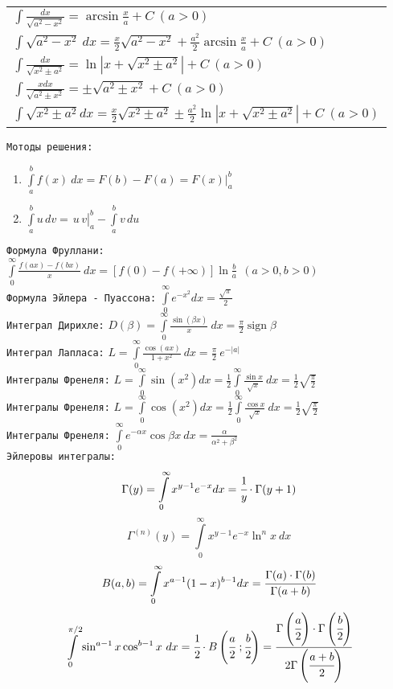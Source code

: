 \documentclass[12pt, a6paper]{extarticle}
\DeclareMathOperator{\sign}{sign}
\begin{document}
\begin{tabular}{l}
$ \displaystyle \int{\frac{dx}{\sqrt{a^2-x^2}}} = \arcsin \frac{x}{a} + C \ (a>0) $ \\
$ \displaystyle \int{\sqrt{a^2-x^2}\ dx} = \frac x2\sqrt{a^2-x^2} + \frac{a^2}{2}\arcsin \frac{x}{a} + C \ (a>0) $ \\
$ \displaystyle \int{\frac{dx}{\sqrt{x^2\pm a^2}}} = \ln \left|x+\sqrt{x^2\pm a^2} \right| + C \ (a>0) $ \\
$ \displaystyle \int{\frac{xdx}{\sqrt{a^2 \pm x^2}}} = \pm \sqrt{a^2 \pm x^2} + C \ (a>0) $ \\
$ \displaystyle \int{\sqrt{x^2\pm a^2} dx} = \frac{x}{2} \sqrt{x^2\pm a^2} \pm \frac{a^2}{2} \ln \left|x+\sqrt{x^2\pm a^2}\right| + C \ (a>0) $ \\
\end{tabular}
\par \- \newline
{\tt Мотоды решения:}
\begin{enumerate}
	\item $ \displaystyle \int\limits_a^b {f(x)\ dx} = F(b)-F(a) = F(x)\biggr |^b_a$
	\item $ \displaystyle \int\limits_a^b {u\,dv} = \left.\frac{}{} u\,v \right|_a^b -\int\limits_a^b{v\, du} $ 
\end{enumerate}
\newpage 
\par \- \newline
{\tt Формула Фруллани:}
$\displaystyle \int\limits_0^\infty{\frac{f(ax)-f(bx)}{x}\ dx} = [f(0)-f(+\infty)]\ln{\frac{b}{a}} \ \ (a>0,b>0) $
\\ {\tt Формула Эйлера - Пуассона:}
$\displaystyle \int\limits_0^\infty{e^{-x^2} dx} = \frac{\sqrt{\pi}}{2} $
\\ {\tt Интеграл Дирихле:}
$\displaystyle D(\beta) = \int\limits_0^\infty{\frac{\sin(\beta x)}{x}\ dx} = \frac{\pi}{2} \sign{\beta} $
\\ {\tt Интеграл Лапласа:}
$\displaystyle L = \int\limits_0^\infty{\frac{\cos(ax)}{1+x^2}\ dx} = \frac{\pi}{2}\ e^{-|a|}$
\\ {\tt Интегралы Френеля:} $\displaystyle L = \int\limits_0^\infty{\sin(x^2) dx} = \frac{1}{2} \int\limits_0^\infty{\frac{\sin x}{\sqrt{x}}\ dx} = \frac{1}{2}\sqrt{\frac{\pi}{2}}$ \\
{\tt Интегралы Френеля:} $\displaystyle L = \int\limits_0^\infty{\cos(x^2) dx} = \frac{1}{2} \int\limits_0^\infty{\frac{\cos x}{\sqrt{x}}\ dx} = \frac{1}{2}\sqrt{\frac{\pi}{2}}$ \\
{\tt Интегралы Френеля:} $\displaystyle \int\limits_0^\infty{e^{-\alpha x} \cos \beta x \ dx} = \frac{\alpha}{\alpha^2+\beta^2} $ \\
{\tt Эйлеровы интегралы:} 
$$ \Gamma(y) = \int\limits_0^\infty{x^{y-1}e^{-x}dx} = \cfrac{1}{y} \cdot \Gamma(y+1) $$
$$ \Gamma^{(n)}(y) = \int\limits_0^\infty{x^{y-1}e^{-x}\ln^{n}x\ dx} $$
$$ B(a,b) = \int\limits^\infty_0{x^{a-1}(1-x)^{b-1}dx} = \cfrac{\Gamma(a) \cdot \Gamma(b)}{\Gamma(a+b)} $$
$$ \int\limits_0^{\pi/2}{\sin^{a-1} x \cos^{b-1} x\ dx} = \cfrac{1}{2} \cdot B \left(\cfrac{a}{2}\ ;\cfrac{b}{2}\right) =\cfrac{\Gamma\left(\cfrac a 2 \right)\cdot\Gamma\left(\cfrac b 2 \right)}{2\Gamma\left(\cfrac{a+b}{2}\right)}$$
\end{document}
